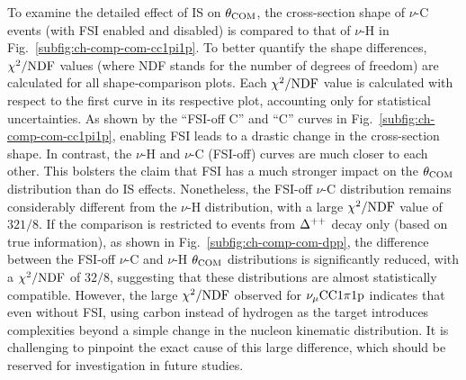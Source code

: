      To examine the detailed effect of IS on $\theta_{\textrm{COM}}$, the cross-section shape of $\nu$-C events (with FSI enabled and disabled) is compared to that of $\nu$-H in Fig.~\ref{subfig:ch-comp-com-cc1pi1p}.
     To better quantify the shape differences, $\chi^2/{\textrm{NDF}}$ values (where NDF stands for the number of degrees of freedom) are calculated for all shape‐comparison plots.
     Each $\chi^2/{\textrm{NDF}}$ value is calculated with respect to the first curve in its respective plot, accounting only for statistical uncertainties.
     As shown by the ``\geta FSI-off C'' and ``\geta C'' curves in Fig.~\ref{subfig:ch-comp-com-cc1pi1p}, enabling FSI leads to a drastic change in the cross-section shape.
     In contrast, the $\nu$-H and $\nu$-C (FSI-off) curves are much closer to each other.
     This bolsters the claim that FSI has a much stronger impact on the $\theta_{\textrm{COM}}$ distribution than do IS effects.
     Nonetheless, the FSI-off $\nu$-C distribution remains considerably different from the $\nu$-H distribution, with a large $\chi^2/{\textrm{NDF}}$ value of $321/8$.
     If the comparison is restricted to events from $\Delta^{++}$ decay only (based on true information), as shown in Fig.~\ref{subfig:ch-comp-com-dpp}, the difference between the FSI-off $\nu$-C and $\nu$-H $\theta_{\textrm{COM}}$ distributions is significantly reduced, with a $\chi^2/{\textrm{NDF}}$ of $32/8$, suggesting that these distributions are almost statistically compatible.
     However, the large $\chi^2/{\textrm{NDF}}$ observed for $\nu_{\mu}\textrm{CC}1\pi1\textrm{p}$ indicates that even without FSI, using carbon instead of hydrogen as the target introduces complexities beyond a simple change in the nucleon kinematic distribution.
     It is challenging to pinpoint the exact cause of this large difference, which should be reserved for investigation in future studies.

